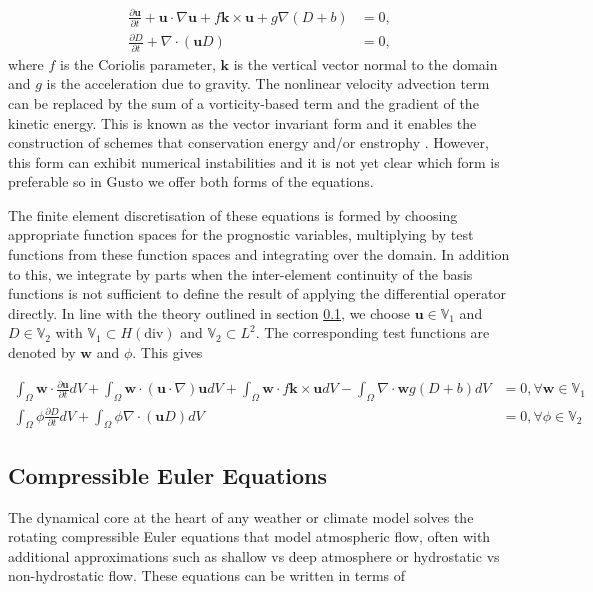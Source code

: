 \documentclass[11pt, a4paper]{article}
\def\MM#1{\boldsymbol{#1}}
\begin{document}
\begin{align}
  \frac{\partial\MM{u}}{\partial t} + \MM{u}\cdot\nabla\MM{u} + f\MM{k}\times\MM{u} + g\nabla (D+b) &= 0, \\
  \frac{\partial D}{\partial t} + \nabla\cdot(\MM{u}D) &= 0,
\end{align}
where $f$ is the Coriolis parameter, $\MM{k}$ is the vertical vector
normal to the domain and $g$ is the acceleration due to gravity. The
nonlinear velocity advection term can be replaced by the sum of a
vorticity-based term and the gradient of the kinetic energy. This is
known as the vector invariant form and it enables the construction of
schemes that conservation energy and/or enstrophy
\citep{mcrae2014energy, bauer2018energy, wimmer2020energy,
  wimmer2021energy}. However, this form can exhibit numerical
instabilities \citep{bell2017numerical} and it is not yet clear which
form is preferable so in Gusto we offer both forms of the equations.

The finite element discretisation of these equations is formed by
choosing appropriate function spaces for the prognostic variables,
multiplying by test functions from these function spaces and
integrating over the domain. In addition to this, we integrate by
parts when the inter-element continuity of the basis functions is not
sufficient to define the result of applying the differential operator
directly. In line with the theory outlined in section \ref{}, we
choose $\MM{u} \in \mathbb{V}_1$ and $D \in \mathbb{V}_2$ with
$\mathbb{V}_1 \subset H(\text{div})$ and $\mathbb{V}_2 \subset L^2$. The
corresponding test functions are denoted by $\MM{w}$ and $\phi$. This gives

\begin{align}
  \int_\Omega\MM{w}\cdot\frac{\partial\MM{u}}{\partial t}dV + \int_\Omega\MM{w}\cdot(\MM{u}\cdot\nabla)\MM{u} dV + \int_\Omega\MM{w}\cdot f\MM{k}\times\MM{u}dV - \int_\Omega \nabla\cdot\MM{w} g(D+b) dV &= 0, \forall \MM{w}\in\mathbb{V}_1 \\
  \int_\Omega\phi\frac{\partial D}{\partial t}dV + \int_\Omega\phi\nabla\cdot(\MM{u}D) dV &= 0, \forall \phi\in\mathbb{V}_2
\end{align}

\subsection{Compressible Euler Equations}
The dynamical core at the heart of any weather or climate model solves
the rotating compressible Euler equations that model atmospheric flow,
often with additional approximations such as shallow vs deep
atmosphere or hydrostatic vs non-hydrostatic flow. These equations can
be written in terms of
\end{document}
